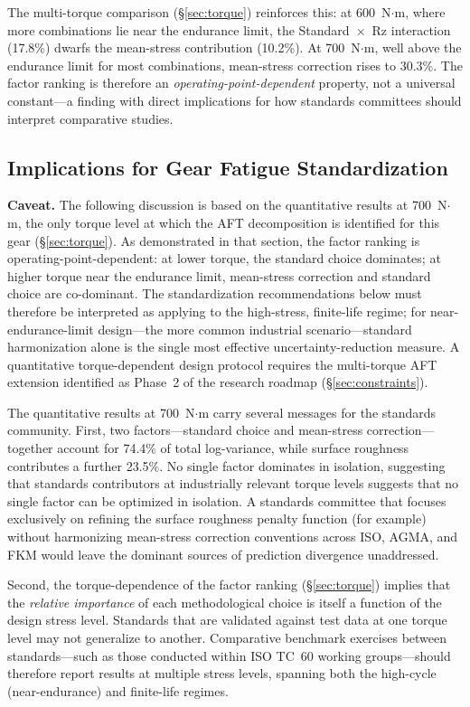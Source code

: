 \documentclass[12pt,a4paper]{article}
\begin{document}
The multi-torque comparison (\S\ref{sec:torque}) reinforces this:
at 600~N$\cdot$m, where more combinations lie near the endurance
limit, the Standard~$\times$~Rz interaction (17.8\%) dwarfs the
mean-stress contribution (10.2\%). At 700~N$\cdot$m, well above the
endurance limit for most combinations, mean-stress correction rises to
30.3\%. The factor ranking is therefore an \emph{operating-point-dependent}
property, not a universal constant---a finding with direct implications
for how standards committees should interpret comparative studies.

\subsection{Implications for Gear Fatigue Standardization}

\textbf{Caveat.} The following discussion is based on the quantitative
results at 700~N$\cdot$m, the only torque level at which the AFT
decomposition is identified for this gear (\S\ref{sec:torque}). As
demonstrated in that section, the factor ranking is
operating-point-dependent: at lower torque, the standard choice
dominates; at higher torque near the endurance limit, mean-stress
correction and standard choice are co-dominant. The standardization
recommendations below must therefore be interpreted as applying to
the high-stress, finite-life regime; for near-endurance-limit
design---the more common industrial scenario---standard harmonization
alone is the single most effective uncertainty-reduction measure.
A quantitative torque-dependent design protocol requires the
multi-torque AFT extension identified as Phase~2 of the research
roadmap (\S\ref{sec:constraints}).

The quantitative results at 700~N$\cdot$m carry several messages for
the standards community. First, two factors---standard choice and
mean-stress correction---together account for 74.4\% of total
log-variance, while surface roughness contributes a further 23.5\%.
No single factor dominates in isolation, suggesting that standards
contributors at industrially relevant torque levels suggests that
no single factor can be optimized in isolation. A standards committee
that focuses exclusively on refining the surface roughness penalty
function (for example) without harmonizing mean-stress correction
conventions across ISO, AGMA, and FKM would leave the dominant
sources of prediction divergence unaddressed.

Second, the torque-dependence of the factor ranking
(\S\ref{sec:torque}) implies that the \emph{relative importance} of
each methodological choice is itself a function of the design stress
level. Standards that are validated against test data at one torque
level may not generalize to another. Comparative benchmark exercises
between standards---such as those conducted within ISO TC~60 working
groups---should therefore report results at multiple stress levels,
spanning both the high-cycle (near-endurance) and finite-life regimes.
\end{document}

